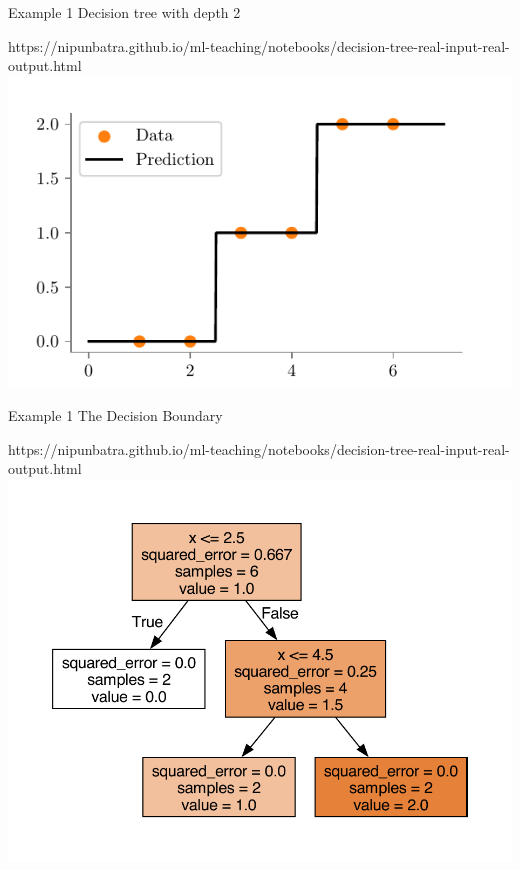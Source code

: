 \documentclass[usenames,dvipsnames]{beamer}
\begin{document}
    \begin{frame}{Example 1}
        Decision tree with depth 2
        \begin{center}
        \begin{notebookbox}{https://nipunbatra.github.io/ml-teaching/notebooks/decision-tree-real-input-real-output.html}
            \includegraphics{../assets/decision-trees/figures/ri-ro-depth-2.pdf}
        \end{notebookbox}
        \end{center}
    \end{frame}
	
    \begin{frame}{Example 1}
        The Decision Boundary
        \begin{center}
            \begin{notebookbox}{https://nipunbatra.github.io/ml-teaching/notebooks/decision-tree-real-input-real-output.html}
                \includegraphics[scale=0.6]{../assets/decision-trees/figures/ri-ro-depth-2-sklearn.pdf}
            \end{notebookbox}
        \end{center}
    \end{frame}
	
\end{document}
